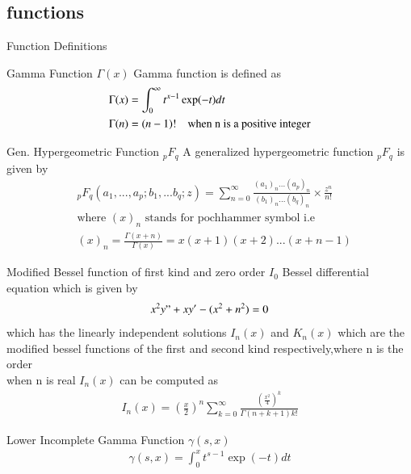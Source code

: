 \documentclass{beamer}
\newcommand{\fbrack}[2]{\genfrac{(}{)}{}{}{#1}{#2}}
\begin{document}
\subsection{functions}
\begin{frame}{Function Definitions}
\begin{block}{Gamma Function \(\Gamma(x)\)}
Gamma function is defined as 
\begin{align}
    &\Gamma(x)=\int_0^\infty t^{x-1} \exp(-t) dt \\ \nonumber
    &\Gamma(n)=(n-1)! \text{\quad when n is a positive integer}
\end{align}
\end{block}
\begin{block}{Gen. Hypergeometric Function \(_{p} F_q\)}
A generalized hypergeometric function \(_{p} F_q\) is given by 
\begin{align}
    &_{p} F_{q} (a_1,...,a_p;b_1,...b_q;z)=\sum_{n=0}^{\infty} \frac{(a_1)_{n}...(a_p)_{n}}{(b_1)_{n}...(b_q)_{n}} \times \frac{z^n}{n!} \label{hypergeo}\\ \nonumber
    &\text{where \((x)_n\) stands for pochhammer symbol i.e}\\ \nonumber 
    &(x)_n =\frac{\Gamma(x+n)}{\Gamma(x)}=x(x+1)(x+2)...(x+n-1)
\end{align}
\end{block}
\end{frame}
\begin{frame}
\begin{block}{Modified Bessel function of first kind and zero order \(I_0\)}
 Bessel differential equation which is given by
\begin{align} \nonumber
    x^{2}y" + x y'-(x^{2} +n^{2})=0
\end{align}
which has the linearly independent solutions \(I_n(x)\) and \(K_n(x)\) which are the modified bessel functions of the first and second kind respectively,where n is the order\\
when n is real \(I_n(x)\) can be computed as 
\begin{align}
    I_n(x)=\fbrack{x}{2}^n \sum_{k=0}^{\infty} \frac{\fbrack{x^2}{4}^k}{\Gamma(n+k+1) k!} \label{bessel}
\end{align}
\end{block}
\begin{block}{Lower Incomplete Gamma Function \(\gamma(s,x)\)}
    \begin{align}
        \gamma(s,x)=\int_{0}^x t^{s-1} \exp(-t) dt
    \end{align}
\end{block}
\end{frame}
\end{document}
